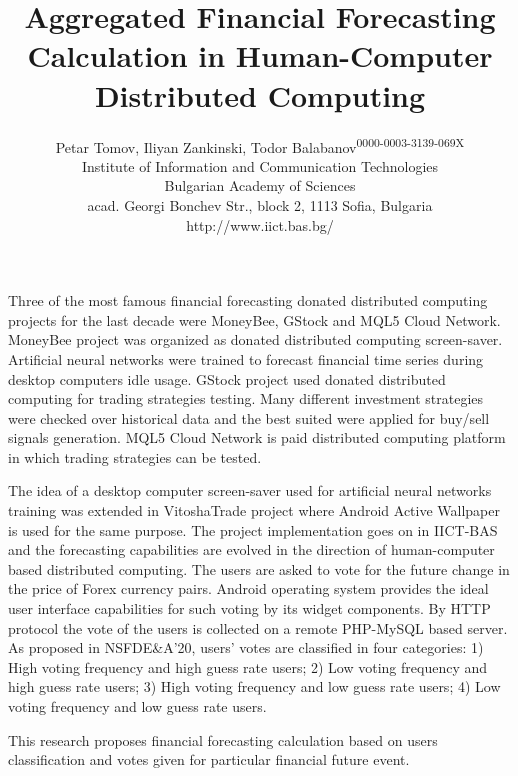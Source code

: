 \documentclass[12pt,a4paper]{article}
\title{\bf Aggregated Financial Forecasting Calculation in Human-Computer Distributed Computing}
\author{Petar Tomov, Iliyan Zankinski, Todor Balabanov\textsuperscript{\tiny 0000-0003-3139-069X} \\ Institute of Information and Communication Technologies \\ Bulgarian Academy of Sciences \\ acad. Georgi Bonchev Str., block 2, 1113 Sofia, Bulgaria \\ http://www.iict.bas.bg/}
\date{}
\begin{document}
 

\maketitle 

Three of the most famous financial forecasting donated distributed computing projects for the last decade were MoneyBee, GStock and MQL5 Cloud Network. MoneyBee project was organized as donated distributed computing screen-saver. Artificial neural networks were trained to forecast financial time series during desktop computers idle usage. GStock project used donated distributed computing for trading strategies testing. Many different investment strategies were checked over historical data and the best suited were applied for buy/sell signals generation. MQL5 Cloud Network is paid distributed computing platform in which trading strategies can be tested. 

The idea of a desktop computer screen-saver used for artificial neural networks training was extended in VitoshaTrade project where Android Active Wallpaper is used for the same purpose. The project implementation goes on in IICT-BAS and the forecasting capabilities are evolved in the direction of human-computer based distributed computing. The users are asked to vote for the future change in the price of Forex currency pairs. Android operating system provides the ideal user interface capabilities for such voting by its widget components. By HTTP protocol the vote of the users is collected on a remote PHP-MySQL based server. As proposed in NSFDE\&A'20, users' votes are classified in four categories: 1) High voting frequency and high guess rate users; 2) Low voting frequency and high guess rate users; 3) High voting frequency and low guess rate users; 4) Low voting frequency and low guess rate users.

This research proposes financial forecasting calculation based on users classification and votes given for particular financial future event. 
\end{document}
